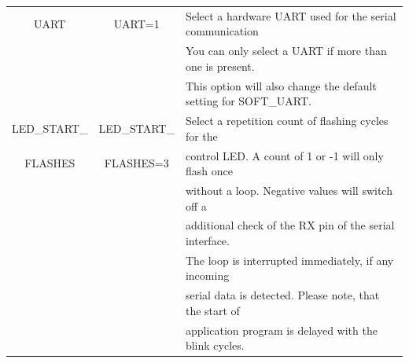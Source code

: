 \begin{table}[H]
\begin{center}
\begin{tabular}{| c | c | l |}
    \hline
    UART           & UART=1         & Select a hardware UART used for the serial communication \\
                   &                & You can only select a UART if more than one is present. \\
		   &		    & This option will also change the default setting for SOFT\_UART.\\
    \hline
 LED\_START\_      & LED\_START\_   & Select a repetition count of flashing cycles for the \\
   FLASHES         &   FLASHES=3    & control LED. A count of 1 or -1 will only flash once \\
                   &                & without a loop. Negative values will switch off a \\
                   &                & additional check of the RX pin of the serial interface. \\
                   &                & The loop is interrupted immediately, if any incoming \\
                   &                & serial data is detected. Please note, that the start of \\
                   &                & application program is delayed with the blink cycles. \\


\end{tabular}
\end{center}
\end{table}
